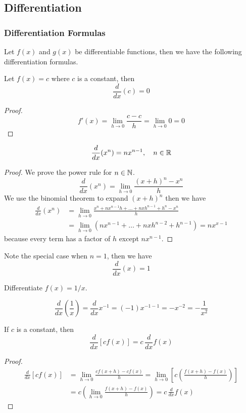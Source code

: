 \subsection{Differentiation}

\subsubsection*{Differentiation Formulas}
Let \(f(x)\) and \(g(x)\) be differentiable functions, then we have the
following differentiation formulas.
\begin{theorem}
    Let \(f(x)=c\) where \(c\) is a constant, then
    \[\frac{d}{dx}(c)=0\]
\end{theorem}
\begin{proof}
    \[f'(x)=\lim_{h\to 0}\frac{c-c}{h}=\lim_{h\to 0}0=0\]
\end{proof}
\begin{theorem}
    \[\frac{d}{dx}(x^n)=nx^{n-1},\quad n\in\mathbb{R}\]
\end{theorem}
\begin{proof}
    We prove the power rule for \(n\in\mathbb{N}\).
    \[\frac{d}{dx}(x^n)=\lim_{h\to 0}\frac{(x+h)^n-x^n}{h}\]
    We use the binomial theorem to expand \((x+h)^n\) then we have
    \begin{align*}
        \frac{d}{dx}(x^n)
        &= \lim_{h\to 0}\frac{x^n+nx^{n-1}h+\dots+nxh^{n-1}+h^n-x^n}{h} \\
        &= \lim_{h\to 0}(nx^{n-1}+\dots+nxh^{n-2}+h^{n-1})=nx^{x-1}
    \end{align*}
    because every term has a factor of \(h\) except \(nx^{n-1}\).
\end{proof}
Note the special case when \(n=1\), then we have \[\frac{d}{dx}(x)=1\]
\begin{problem}
    Differentiate \(f(x)=1/x\).
\end{problem}
\begin{solution}
    \[\frac{d}{dx}\left(\frac{1}{x}\right)=\frac{d}{dx}x^{-1}=(-1)x^{-1-1}
    =-x^{-2}=-\frac{1}{x^2}\]
\end{solution}
\begin{theorem}
    If \(c\) is a constant, then
    \[\frac{d}{dx}[cf(x)]=c\,\frac{d}{dx}f(x)\]
\end{theorem}
\begin{proof}
    \begin{align*}
        \frac{d}{dx}[cf(x)]&= \lim_{h\to 0}\frac{cf(x+h)-cf(x)}{h}
        =\lim_{h\to 0}\left[c\left(\frac{f(x+h)-f(x)}{h}\right)\right] \\
        &= c\left(\lim_{h\to 0}\frac{f(x+h)-f(x)}{h}\right)
        =c\,\frac{d}{dx}f(x)
    \end{align*}
\end{proof}
